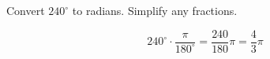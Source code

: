 Convert $240^{\circ}$ to radians. Simplify any fractions.

$$
240^{\circ} \cdot \frac{\pi}{180^{\circ}} = \frac{240}{180} \pi = \frac{4}{3} \pi
$$
